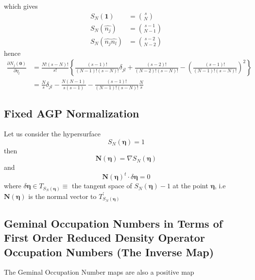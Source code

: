 \documentclass[aps,preprint]{revtex4}%
\begin{document}
which gives
\begin{align}
S_{N}\left(  \mathbf{1}\right)   &  =\binom{s}{N}\\
S_{N}\left(  \widehat{n_{j}}\right)   &  =\binom{s-1}{N-1}\\
S_{N}\left(  \widehat{n_{j}}\widehat{n_{l}}\right)   &  =\binom{s-2}{N-2}%
\end{align}
hence%
\begin{align}
\frac{\partial N_{j}\left(  \mathbf{0}\right)  }{\partial\eta_{l}} &
=\frac{N!\left(  s-N\right)  !}{s!}\left\{  \frac{\left(  s-1\right)
!}{\left(  N-1\right)  !\left(  s-N\right)  !}\delta_{jl}+\frac{\left(
s-2\right)  !}{\left(  N-2\right)  !\left(  s-N\right)  !}-\left(
\frac{\left(  s-1\right)  !}{\left(  N-1\right)  !\left(  s-N\right)
!}\right)  ^{2}\right\}  \\
&  =\frac{N}{s}\delta_{jl}-\frac{N\left(  N-1\right)  }{s\left(  s-1\right)
}-\frac{\left(  s-1\right)  !}{\left(  N-1\right)  !\left(  s-N\right)
!}\frac{N}{s}%
\end{align}


\subsection{Fixed AGP Normalization}

Let us consider the hypersurface
\begin{equation}
S_{N}\left(  \mathbf{\eta}\right)  =1
\end{equation}
then
\begin{equation}
\mathbf{N}\left(  \mathbf{\eta}\right)  =\nabla S_{N}\left(  \mathbf{\eta
}\right)
\end{equation}
and
\begin{equation}
\mathbf{N}\left(  \mathbf{\eta}\right)  ^{t}\cdot\delta\mathbf{\eta}=0
\end{equation}
where $\delta\mathbf{\eta\in}T_{S_{N}\left(  \mathbf{\eta}\right)  }\equiv$
the tangent space of $S_{N}\left(  \mathbf{\eta}\right)  -1$ at the point
$\mathbf{\eta}$, i.e $\mathbf{N}\left(  \mathbf{\eta}\right)  $ is the normal
vector to $T_{S_{N}\left(  \mathbf{\eta}\right)  }^{\prime}$ 

\subsection{Geminal Occupation Numbers in Terms of First Order Reduced Density
Operator Occupation Numbers (The Inverse Map)}

The Geminal Occupation Number maps are also a positive map%
\end{document}
